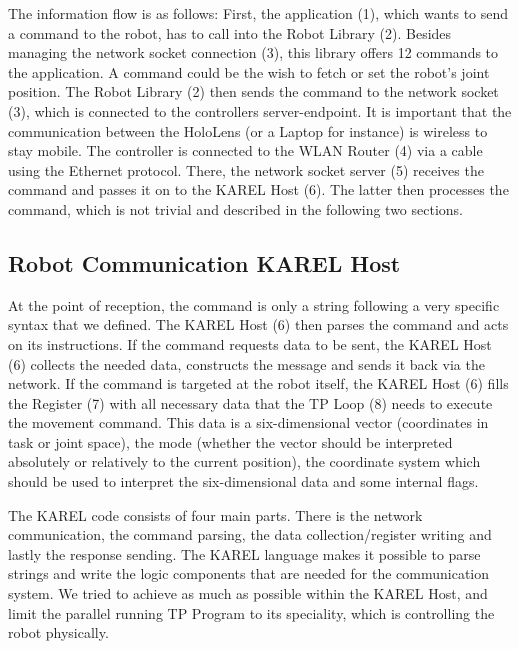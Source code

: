 The information flow is as follows: First, the application (1), which wants to send a command to the robot, has to call into the Robot Library (2). Besides managing the network socket connection (3), this library offers 12 commands to the application. A command could be the wish to fetch or set the robot's joint position. The Robot Library (2) then sends the command to the network socket (3), which is connected to the controllers server-endpoint. It is important that the communication between the HoloLens (or a Laptop for instance) is wireless to stay mobile. The controller is connected to the WLAN Router (4) via a cable using the Ethernet protocol. There, the network socket server (5) receives the command and passes it on to the KAREL Host (6). The latter then processes the command, which is not trivial and described in the following two sections.

\subsection{Robot Communication KAREL Host}
\label{Section:RobotCommunicationKAREL}

At the point of reception, the command is only a string following a very specific syntax that we defined. The KAREL Host (6) then parses the command and acts on its instructions. If the command requests data to be sent, the KAREL Host (6) collects the needed data, constructs the message and sends it back via the network. If the command is targeted at the robot itself, the KAREL Host (6) fills the Register (7) with all necessary data that the TP Loop (8) needs to execute the movement command. This data is a six-dimensional vector (coordinates in task or joint space), the mode (whether the vector should be interpreted absolutely or relatively to the current position), the coordinate system which should be used to interpret the six-dimensional data and some internal flags.

The KAREL code consists of four main parts. There is the network communication, the command parsing, the data collection/register writing and lastly the response sending. The KAREL language makes it possible to parse strings and write the logic components that are needed for the communication system. We tried to achieve as much as possible within the KAREL Host, and limit the parallel running TP Program to its speciality, which is controlling the robot physically.

